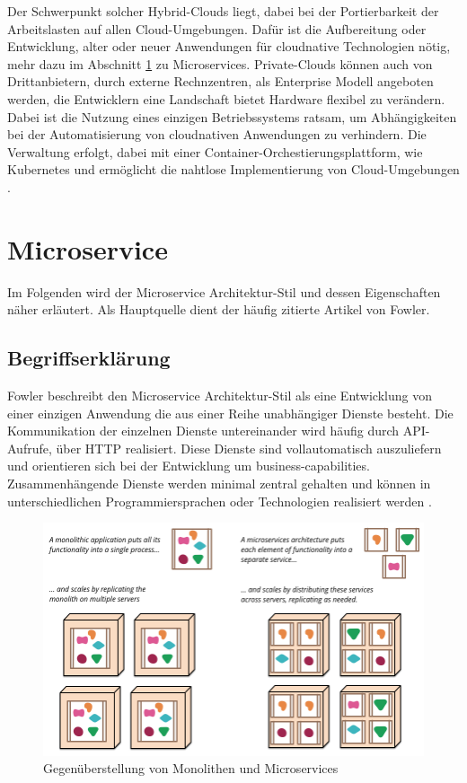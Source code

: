Der Schwerpunkt solcher Hybrid-Clouds liegt, dabei bei der Portierbarkeit der Arbeitslasten auf allen Cloud-Umgebungen.
Dafür ist die Aufbereitung oder Entwicklung, alter oder neuer Anwendungen für cloudnative Technologien nötig, mehr dazu im Abschnitt \ref{Microservice} zu Microservices.
Private-Clouds können auch von Drittanbietern, durch externe Rechnzentren, als Enterprise Modell angeboten werden, die Entwicklern eine Landschaft bietet
Hardware flexibel zu verändern. Dabei ist die Nutzung eines einzigen Betriebssystems ratsam, um Abhängigkeiten bei der Automatisierung von cloudnativen Anwendungen zu verhindern.
Die Verwaltung erfolgt, dabei mit einer Container-Orchestierungsplattform, wie Kubernetes und ermöglicht die nahtlose Implementierung von Cloud-Umgebungen \cite{ibmHybrid}.

\section{Microservice}\label{Microservice}
Im Folgenden wird der Microservice Architektur-Stil und dessen Eigenschaften näher erläutert.
Als Hauptquelle dient der häufig zitierte Artikel \cite{FowlerMicroservice} von Fowler.

\subsection{Begriffserklärung}
Fowler beschreibt den Microservice Architektur-Stil als eine Entwicklung von einer einzigen Anwendung die aus einer Reihe unabhängiger Dienste besteht. 
Die Kommunikation der einzelnen Dienste untereinander wird häufig durch API-Aufrufe, über HTTP realisiert. 
Diese Dienste sind vollautomatisch auszuliefern und orientieren sich bei der Entwicklung um business-capabilities. 
Zusammenhängende Dienste werden minimal zentral gehalten und können in unterschiedlichen Programmiersprachen oder Technologien realisiert werden \cite{FowlerMicroservice}.

\begin{figure}[!htb]
  \centering
  \includegraphics[width=0.8\columnwidth]{images/MonolithsAndMicroservices.png}
  \caption{Gegenüberstellung von Monolithen und Microservices \cite{FowlerMicroservice}}
  \label{fig:monlithmicroservice}
\end{figure}

